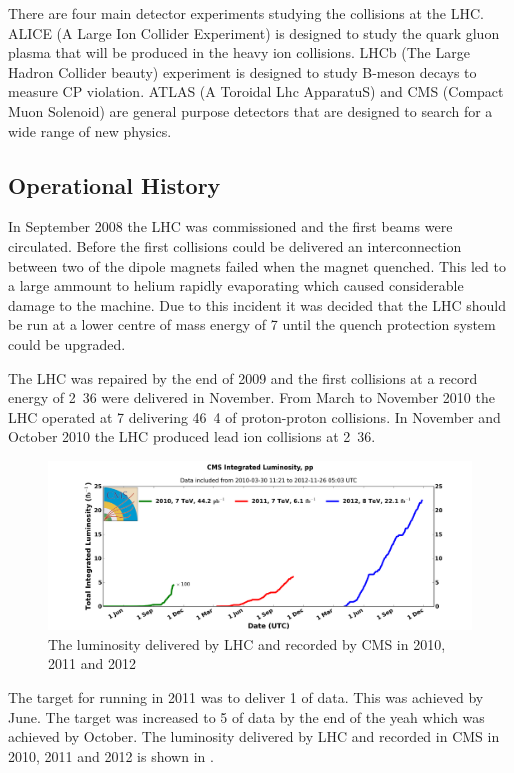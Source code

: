 There are four main detector experiments studying the collisions at the LHC. 
ALICE (A Large Ion Collider Experiment) is designed to study the quark gluon
plasma that will be produced in the heavy ion collisions. 
LHCb (The Large Hadron Collider beauty) experiment is designed to study B-meson
decays to measure CP violation. 
ATLAS (A Toroidal Lhc ApparatuS) and CMS (Compact Muon Solenoid) are general
purpose detectors that are designed 
to search for a wide range of new physics.\cite{lhc}

\subsection{Operational History}
In September 2008 the LHC was commissioned and the first beams were circulated.
Before the first collisions could be delivered an interconnection
between two of the dipole magnets failed when the magnet quenched.
This led to a large ammount to helium rapidly evaporating which caused
considerable damage to the machine.
Due to this incident it was decided that the LHC should be run at a lower centre
of mass energy of \unit{7}{\TeV} until the quench protection system could be
upgraded.

The LHC was repaired by the end of 2009 and the first collisions at a record
energy of \unit{2.36}{\TeV} were delivered in November. 
From March to November 2010 the LHC operated at \unit{7}{\TeV} delivering
\unit{46.4}{\invpb} of proton-proton collisions.
In November and October 2010 the LHC produced lead ion collisions at
\unit{2.36}{\TeV}.

\begin{figure}[htb!]
  \centering
  \includegraphics[width=\textwidth]{int_lumi_cumulative_pp_1.png}
  \caption{The luminosity delivered by LHC and recorded by CMS in 2010, 2011 and 2012}
  \label{fig:LHC2010}
\end{figure}


The target for running in 2011 was to deliver \unit{1}{\invfb} of data. This was
achieved by June. The target was increased to \unit{5}{\invfb} of data by the end
of the yeah which was achieved by October.
The luminosity delivered by LHC and recorded in CMS in 2010, 2011 and 2012 is
shown in .


